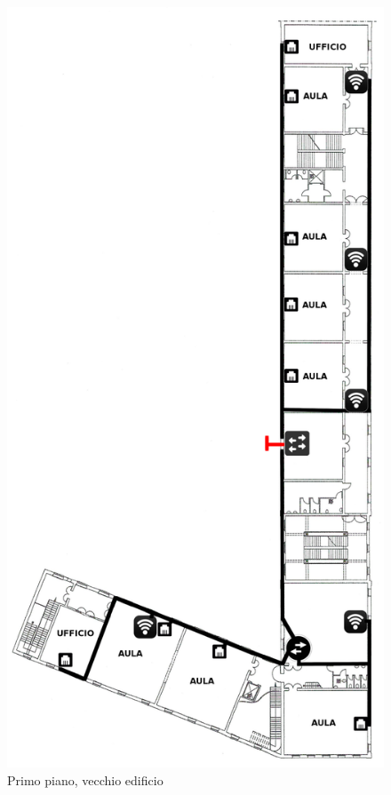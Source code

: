 \documentclass[11pt, a4paper, oneside]{article}
\begin{document}
			\begin{figure}[H]
				\caption{Primo piano, vecchio edificio}
				\includegraphics[scale=0.2]{architecture-002.png}
			\end{figure}
\end{document}
